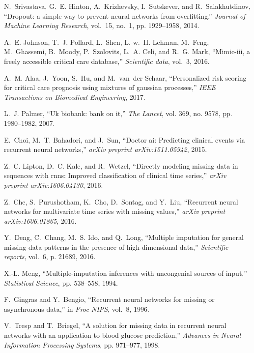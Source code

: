 \documentclass{article}
\begin{document}
\begin{thebibliography}{10}
	N.~Srivastava, G.~E. Hinton, A.~Krizhevsky, I.~Sutskever, and R.~Salakhutdinov,
	``Dropout: a simple way to prevent neural networks from overfitting.''
	\emph{Journal of Machine Learning Research}, vol.~15, no.~1, pp. 1929--1958,
	2014.
	
	A.~E. Johnson, T.~J. Pollard, L.~Shen, L.-w.~H. Lehman, M.~Feng, M.~Ghassemi,
	B.~Moody, P.~Szolovits, L.~A. Celi, and R.~G. Mark, ``Mimic-iii, a freely
	accessible critical care database,'' \emph{Scientific data}, vol.~3, 2016.
	
	A.~M. Alaa, J.~Yoon, S.~Hu, and M.~van~der Schaar, ``Personalized risk scoring
	for critical care prognosis using mixtures of gaussian processes,''
	\emph{IEEE Transactions on Biomedical Engineering}, 2017.
	
	L.~J. Palmer, ``Uk biobank: bank on it,'' \emph{The Lancet}, vol. 369, no.
	9578, pp. 1980--1982, 2007.
	
	E.~Choi, M.~T. Bahadori, and J.~Sun, ``Doctor ai: Predicting clinical events
	via recurrent neural networks,'' \emph{arXiv preprint arXiv:1511.05942},
	2015.
	
	Z.~C. Lipton, D.~C. Kale, and R.~Wetzel, ``Directly modeling missing data in
	sequences with rnns: Improved classification of clinical time series,''
	\emph{arXiv preprint arXiv:1606.04130}, 2016.
	
	Z.~Che, S.~Purushotham, K.~Cho, D.~Sontag, and Y.~Liu, ``Recurrent neural
	networks for multivariate time series with missing values,'' \emph{arXiv
		preprint arXiv:1606.01865}, 2016.
	
	Y.~Deng, C.~Chang, M.~S. Ido, and Q.~Long, ``Multiple imputation for general
	missing data patterns in the presence of high-dimensional data,''
	\emph{Scientific reports}, vol.~6, p. 21689, 2016.
	
	X.-L. Meng, ``Multiple-imputation inferences with uncongenial sources of
	input,'' \emph{Statistical Science}, pp. 538--558, 1994.
	
	F.~Gingras and Y.~Bengio, ``Recurrent neural networks for missing or
	asynchronous data,'' in \emph{Proc NIPS}, vol.~8, 1996.
	
	V.~Tresp and T.~Briegel, ``A solution for missing data in recurrent neural
	networks with an application to blood glucose prediction,'' \emph{Advances in
		Neural Information Processing Systems}, pp. 971--977, 1998.
	

\end{thebibliography}
\end{document}

